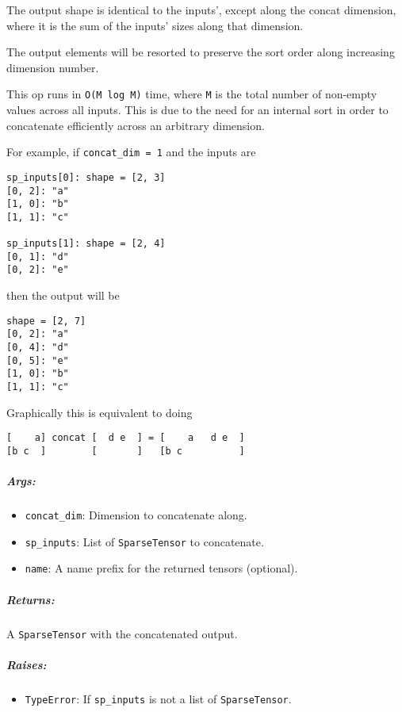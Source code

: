 The output shape is identical to the inputs', except along the concat
dimension, where it is the sum of the inputs' sizes along that
dimension.

The output elements will be resorted to preserve the sort order along
increasing dimension number.

This op runs in \texttt{O(M\ log\ M)} time, where \texttt{M} is the
total number of non-empty values across all inputs. This is due to the
need for an internal sort in order to concatenate efficiently across an
arbitrary dimension.

For example, if \texttt{concat\_dim\ =\ 1} and the inputs are

\begin{verbatim}
sp_inputs[0]: shape = [2, 3]
[0, 2]: "a"
[1, 0]: "b"
[1, 1]: "c"

sp_inputs[1]: shape = [2, 4]
[0, 1]: "d"
[0, 2]: "e"
\end{verbatim}

then the output will be

\begin{verbatim}
shape = [2, 7]
[0, 2]: "a"
[0, 4]: "d"
[0, 5]: "e"
[1, 0]: "b"
[1, 1]: "c"
\end{verbatim}

Graphically this is equivalent to doing

\begin{verbatim}
[    a] concat [  d e  ] = [    a   d e  ]
[b c  ]        [       ]   [b c          ]
\end{verbatim}

\subparagraph{Args: }\label{args-4}

\begin{itemize}
\tightlist
\item
  \texttt{concat\_dim}: Dimension to concatenate along.
\item
  \texttt{sp\_inputs}: List of \texttt{SparseTensor} to concatenate.
\item
  \texttt{name}: A name prefix for the returned tensors (optional).
\end{itemize}

\subparagraph{Returns: }\label{returns-6}

A \texttt{SparseTensor} with the concatenated output.

\subparagraph{Raises: }\label{raises-2}

\begin{itemize}
\tightlist
\item
  \texttt{TypeError}: If \texttt{sp\_inputs} is not a list of
  \texttt{SparseTensor}.
\end{itemize}


